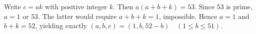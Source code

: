 Write $c=ak$ with positive integer $k$. Then $a(a+b+k)=53$. Since $53$ is prime, $a=1$ or $53$. The latter would require $a+b+k=1$, impossible. Hence $a=1$ and $b+k=52$, yielding exactly $\boxed{(a,b,c)=(1,b,52-b)\quad(1\le b\le51)}$.
